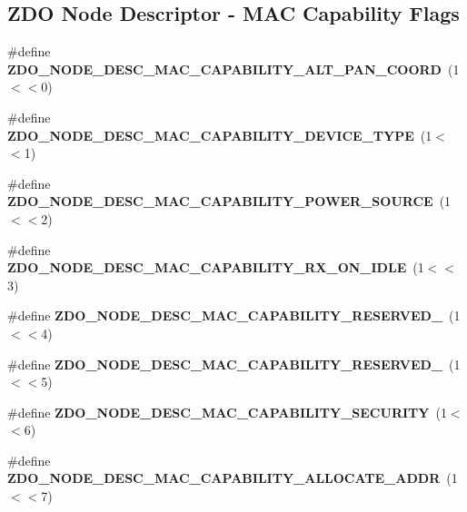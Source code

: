 \subsection*{Z\-D\-O Node Descriptor -\/ M\-A\-C Capability Flags}
\begin{DoxyCompactItemize}
\item 
\hypertarget{group__zdo_ga6a1870a7d244cc148bc65fc2f5e78af7}{\#define {\bfseries Z\-D\-O\-\_\-\-N\-O\-D\-E\-\_\-\-D\-E\-S\-C\-\_\-\-M\-A\-C\-\_\-\-C\-A\-P\-A\-B\-I\-L\-I\-T\-Y\-\_\-\-A\-L\-T\-\_\-\-P\-A\-N\-\_\-\-C\-O\-O\-R\-D}~(1$<$$<$0)}\label{group__zdo_ga6a1870a7d244cc148bc65fc2f5e78af7}

\item 
\hypertarget{group__zdo_ga0eb8cdab069e6e7fef3e092f685f8aee}{\#define {\bfseries Z\-D\-O\-\_\-\-N\-O\-D\-E\-\_\-\-D\-E\-S\-C\-\_\-\-M\-A\-C\-\_\-\-C\-A\-P\-A\-B\-I\-L\-I\-T\-Y\-\_\-\-D\-E\-V\-I\-C\-E\-\_\-\-T\-Y\-P\-E}~(1$<$$<$1)}\label{group__zdo_ga0eb8cdab069e6e7fef3e092f685f8aee}

\item 
\hypertarget{group__zdo_ga50f63999d9dc3a726d3efa967d73b1b1}{\#define {\bfseries Z\-D\-O\-\_\-\-N\-O\-D\-E\-\_\-\-D\-E\-S\-C\-\_\-\-M\-A\-C\-\_\-\-C\-A\-P\-A\-B\-I\-L\-I\-T\-Y\-\_\-\-P\-O\-W\-E\-R\-\_\-\-S\-O\-U\-R\-C\-E}~(1$<$$<$2)}\label{group__zdo_ga50f63999d9dc3a726d3efa967d73b1b1}

\item 
\hypertarget{group__zdo_gabc8be41d8e8da1b6aa8e2acdfc12e36f}{\#define {\bfseries Z\-D\-O\-\_\-\-N\-O\-D\-E\-\_\-\-D\-E\-S\-C\-\_\-\-M\-A\-C\-\_\-\-C\-A\-P\-A\-B\-I\-L\-I\-T\-Y\-\_\-\-R\-X\-\_\-\-O\-N\-\_\-\-I\-D\-L\-E}~(1$<$$<$3)}\label{group__zdo_gabc8be41d8e8da1b6aa8e2acdfc12e36f}

\item 
\hypertarget{group__zdo_ga3ddc671709736fef6059f858b1dc5237}{\#define {\bfseries Z\-D\-O\-\_\-\-N\-O\-D\-E\-\_\-\-D\-E\-S\-C\-\_\-\-M\-A\-C\-\_\-\-C\-A\-P\-A\-B\-I\-L\-I\-T\-Y\-\_\-\-R\-E\-S\-E\-R\-V\-E\-D\-\_}~(1$<$$<$4)}\label{group__zdo_ga3ddc671709736fef6059f858b1dc5237}

\item 
\hypertarget{group__zdo_ga95eda5277af7fcade9ebadbc0b1bb5b0}{\#define {\bfseries Z\-D\-O\-\_\-\-N\-O\-D\-E\-\_\-\-D\-E\-S\-C\-\_\-\-M\-A\-C\-\_\-\-C\-A\-P\-A\-B\-I\-L\-I\-T\-Y\-\_\-\-R\-E\-S\-E\-R\-V\-E\-D\-\_}~(1$<$$<$5)}\label{group__zdo_ga95eda5277af7fcade9ebadbc0b1bb5b0}

\item 
\hypertarget{group__zdo_ga76652fe1ab732b4345e932f10a2e94f8}{\#define {\bfseries Z\-D\-O\-\_\-\-N\-O\-D\-E\-\_\-\-D\-E\-S\-C\-\_\-\-M\-A\-C\-\_\-\-C\-A\-P\-A\-B\-I\-L\-I\-T\-Y\-\_\-\-S\-E\-C\-U\-R\-I\-T\-Y}~(1$<$$<$6)}\label{group__zdo_ga76652fe1ab732b4345e932f10a2e94f8}

\item 
\hypertarget{group__zdo_ga5c906be729a9f9e0fb63ff600fcd9777}{\#define {\bfseries Z\-D\-O\-\_\-\-N\-O\-D\-E\-\_\-\-D\-E\-S\-C\-\_\-\-M\-A\-C\-\_\-\-C\-A\-P\-A\-B\-I\-L\-I\-T\-Y\-\_\-\-A\-L\-L\-O\-C\-A\-T\-E\-\_\-\-A\-D\-D\-R}~(1$<$$<$7)}\label{group__zdo_ga5c906be729a9f9e0fb63ff600fcd9777}

\end{DoxyCompactItemize}
